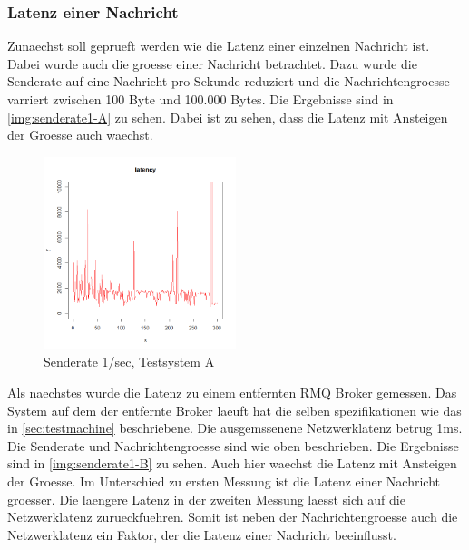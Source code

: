 \subsubsection{Latenz einer Nachricht}
Zunaechst soll geprueft werden wie die Latenz einer einzelnen Nachricht ist. Dabei wurde auch die groesse einer Nachricht betrachtet. Dazu wurde die Senderate auf eine Nachricht pro Sekunde reduziert und die Nachrichtengroesse varriert zwischen 100 Byte und 100.000 Bytes.
Die Ergebnisse sind in \autoref{img:senderate1-A} zu sehen. Dabei ist zu sehen, dass die Latenz mit Ansteigen der Groesse auch waechst. 
\begin{figure}
\center
  \includegraphics[width=0.5\textwidth]{images/ratelimit1.png}
  \caption{Senderate 1/sec, Testsystem A}
  \label{img:senderate1-A}
\end{figure}
Als naechstes wurde die Latenz zu einem entfernten RMQ Broker gemessen. Das System auf dem der entfernte Broker laeuft hat die selben spezifikationen wie das in \autoref{sec:testmachine} beschriebene. Die ausgemssenene Netzwerklatenz betrug 1ms. Die Senderate und Nachrichtengroesse sind wie oben beschrieben. Die Ergebnisse sind in \autoref{img:senderate1-B} zu sehen. Auch hier waechst die Latenz mit Ansteigen der Groesse. Im Unterschied zu ersten Messung ist die Latenz einer Nachricht groesser. 
Die laengere Latenz in der zweiten Messung laesst sich auf die Netzwerklatenz zurueckfuehren. Somit ist neben der Nachrichtengroesse auch die Netzwerklatenz ein Faktor, der die Latenz einer Nachricht beeinflusst.

